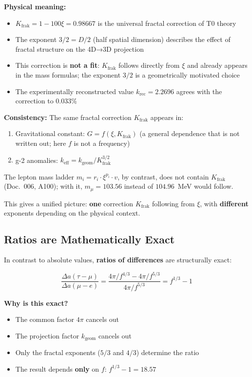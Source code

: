 	\textbf{Physical meaning:}
	\begin{itemize}
		\item $K_\text{frak} = 1 - 100\xi = 0.98667$ is the universal fractal correction of T0 theory
		\item The exponent $3/2 = D/2$ (half spatial dimension) describes the effect of fractal structure on the 4D→3D projection
		\item This correction is \textbf{not a fit}: $K_\text{frak}$ follows directly from $\xi$ and already appears in the mass formulas; the exponent $3/2$ is a geometrically motivated choice
		\item The experimentally reconstructed value $k_\text{rec} = 2.2696$ agrees with the correction to 0.033\%
	\end{itemize}
	
	\textbf{Consistency:} The same fractal correction $K_\text{frak}$ appears in:
	\begin{enumerate}
		\item Gravitational constant: $G = f(\xi, K_\text{frak})$ (a general dependence that is not written out; here $f$ is not a frequency)
		\item g-2 anomalies: $k_\text{eff} = k_\text{geom} / K_\text{frak}^{3/2}$
	\end{enumerate}
	The lepton mass ladder $m_i = r_i \cdot \xi^{p_i} \cdot v$, by contrast, does not contain $K_\text{frak}$ (Doc.~006, A100); with it, $m_\mu = 103.56$ instead of $104.96$~MeV would follow.
	
	This gives a unified picture: \textbf{one} correction $K_\text{frak}$ following from $\xi$, with \textbf{different} exponents depending on the physical context.
	
	\subsection{Ratios are Mathematically Exact}
	
	In contrast to absolute values, \textbf{ratios of differences} are structurally exact:
	
	\begin{equation}
		\frac{\Delta a(\tau - \mu)}{\Delta a(\mu - e)} = \frac{4\pi/f^{4/3} - 4\pi/f^{5/3}}{4\pi/f^{5/3}} = f^{1/3} - 1
	\end{equation}
	
	\textbf{Why is this exact?}
	
	\begin{itemize}
		\item The common factor $4\pi$ cancels out
		\item The projection factor $k_{\text{geom}}$ cancels out
		\item Only the fractal exponents ($5/3$ and $4/3$) determine the ratio
		\item The result depends \textbf{only} on $f$: $f^{1/3} - 1 = 18.57$
	\end{itemize}
	
